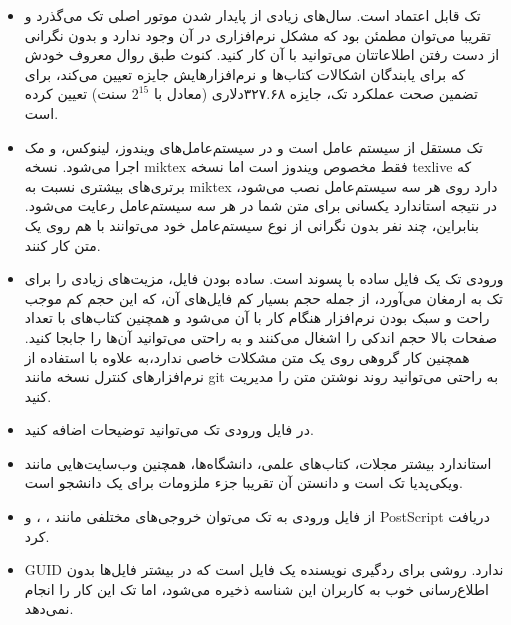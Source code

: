 \documentclass[a4paper,12pt]{report}
\begin{document}
\begin{itemize}
\item
تک قابل اعتماد است.
 سال‌های زیادی از پایدار شدن موتور اصلی تک می‌گذرد و تقریبا می‌توان مطمئن بود که مشکل نرم‌افزاری در آن وجود ندارد و بدون نگرانی از دست رفتن اطلاعاتتان می‌توانید با آن کار کنید. کنوث طبق روال معروف خودش که برای یابندگان اشکالات کتاب‌ها و نرم‌افزارهایش جایزه تعیین می‌کند، برای تضمین صحت عملکرد تک، جایزه ۳۲۷.۶۸دلاری (معادل با $2^{15}$ سنت) تعیین کرده است.

\item
تک مستقل از سیستم عامل است 
و در سیستم‌عامل‌های ویندوز، لینوکس، و مک اجرا می‌شود. نسخه miktex فقط مخصوص ویندوز است اما نسخه texlive که برتری‌های بیشتری نسبت به miktex دارد
روی هر سه سیستم‌عامل نصب می‌شود، در نتیجه استاندارد یکسانی برای متن شما در هر سه سیستم‌عامل رعایت می‌شود. بنابراین، چند نفر بدون نگرانی از نوع سیستم‌عامل خود می‌توانند با هم روی یک متن کار کنند.

\item
ورودی تک یک فایل ساده با پسوند  است.
 ساده بودن فایل، مزیت‌های زیادی را برای تک به ارمغان می‌آورد، از جمله حجم بسیار کم فایل‌های آن،  که این حجم کم موجب راحت و سبک بودن نرم‌افزار هنگام کار با آن می‌شود و همچنین کتاب‌های با تعداد صفحات بالا حجم اندکی را اشغال می‌کنند و به راحتی می‌توانید آن‌ها را جابجا کنید. همچنین کار گروهی روی یک متن مشکلات خاصی ندارد،‌به علاوه با استفاده از نرم‌افزارهای کنترل نسخه مانند git به راحتی می‌توانید روند نوشتن متن را مدیریت کنید.

\item
{}
در فایل ورودی تک می‌توانید توضیحات اضافه کنید. 
\item
استاندارد بیشتر مجلات، کتاب‌های علمی، دانشگاه‌ها، همچنین وب‌سایت‌هایی مانند ویکی‌پدیا تک است و دانستن آن تقریبا جزء ملزومات برای یک دانشجو است.

\item
از فایل ورودی به تک می‌توان خروجی‌های مختلفی مانند ،
،
 و PostScript دریافت کرد.

\item
GUID
ندارد. 
روشی برای ردگیری نویسنده یک فایل است که در بیشتر فایل‌ها بدون اطلاع‌رسانی خوب به کاربران این شناسه ذخیره می‌شود، اما تک این کار را انجام نمی‌دهد.

\end{itemize}
\end{document}

